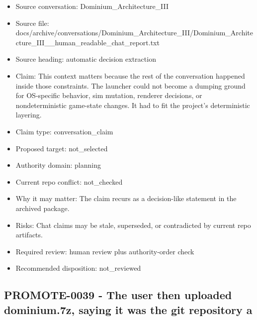\documentclass[11pt,a4paper]{report}
\begin{document}
\begin{itemize}
\item Source conversation: Dominium\_Architecture\_III
\item Source file: docs/archive/conversations/Dominium\_Architecture\_III/Dominium\_Architecture\_III\_\_human\_readable\_chat\_report.txt
\item Source heading: automatic decision extraction
\item Claim: This context matters because the rest of the conversation happened inside those constraints. The launcher could not become a dumping ground for OS-specific behavior, sim mutation, renderer decisions, or nondeterministic game-state changes. It had to fit the project's deterministic layering.
\item Claim type: conversation\_claim
\item Proposed target: not\_selected
\item Authority domain: planning
\item Current repo conflict: not\_checked
\item Why it may matter: The claim recurs as a decision-like statement in the archived package.
\item Risks: Chat claims may be stale, superseded, or contradicted by current repo artifacts.
\item Required review: human review plus authority-order check
\item Recommended disposition: not\_reviewed
\end{itemize}

\subsection{PROMOTE-0039 - The user then uploaded dominium.7z, saying it was the git repository a}
\end{document}

